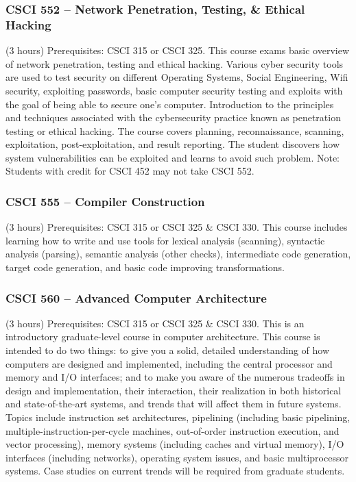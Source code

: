 \subsubsection{CSCI 552 -- Network Penetration, Testing, \& Ethical Hacking}
(3 hours) Prerequisites: CSCI 315 or CSCI 325. This course exams basic overview of network penetration, testing and ethical hacking. Various cyber security tools are used to test security on different Operating Systems, Social Engineering, Wifi security, exploiting passwords, basic computer security testing and exploits with the goal of being able to secure one’s computer. Introduction to the principles and techniques associated with the cybersecurity practice known as penetration testing or ethical hacking. The course covers planning, reconnaissance, scanning, exploitation, post-exploitation, and result reporting. The student discovers how system vulnerabilities can be exploited and learns to avoid such problem. Note: Students with credit for CSCI 452 may not take CSCI 552.

\subsubsection{CSCI 555 -- Compiler Construction}
(3 hours) Prerequisites: CSCI 315 or CSCI 325 \& CSCI 330. This course includes learning how to write and use tools for lexical analysis (scanning), syntactic analysis (parsing), semantic analysis (other checks), intermediate code generation, target code generation, and basic code improving transformations.

\subsubsection{CSCI 560 -- Advanced Computer Architecture}
(3 hours) Prerequisites: CSCI 315 or CSCI 325 \& CSCI 330. This is an introductory graduate-level course in computer architecture. This course is intended to do two things: to give you a solid, detailed understanding of how computers are designed and implemented, including the central processor and memory and I/O interfaces; and to make you aware of the numerous tradeoffs in design and implementation, their interaction, their realization in both historical and state-of-the-art systems, and trends that will affect them in future systems. Topics include instruction set architectures, pipelining (including basic pipelining, multiple-instruction-per-cycle machines, out-of-order instruction execution, and vector processing), memory systems (including caches and virtual memory), I/O interfaces (including networks), operating system issues, and basic multiprocessor systems.  Case studies on current trends will be required from graduate students. 

